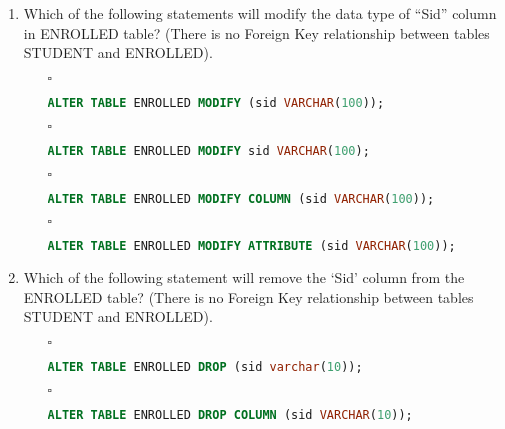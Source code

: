 \documentclass[10pt]{article}
\begin{document}
\begin{enumerate}
			\item Which of the following statements will modify the data type of “Sid” column in ENROLLED table? (There is no Foreign Key relationship between tables STUDENT and ENROLLED).
				\begin{enumerate}
					\item[$\square$] 
						\begin{lstlisting}[language=SQL,firstline=1, lastline=1, numbers = right] 
							ALTER TABLE ENROLLED MODIFY (sid VARCHAR(100));
						\end{lstlisting}
					
					\item[$\square$] 
						\begin{lstlisting}[language=SQL,firstline=1, lastline=1, numbers = right] 
							ALTER TABLE ENROLLED MODIFY sid VARCHAR(100);
						\end{lstlisting}
					
					\item[$\square$] 
						\begin{lstlisting}[language=SQL,firstline=1, lastline=1, numbers = right] 
							ALTER TABLE ENROLLED MODIFY COLUMN (sid VARCHAR(100));
						\end{lstlisting}
				
					\item[$\square$] 
						\begin{lstlisting}[language=SQL,firstline=1, lastline=1, numbers = right] 
							ALTER TABLE ENROLLED MODIFY ATTRIBUTE (sid VARCHAR(100));
						\end{lstlisting}
				\end{enumerate}
			
			\item Which of the following statement will remove the ‘Sid’ column from the ENROLLED table? (There is no Foreign Key relationship between tables STUDENT and ENROLLED).
				\begin{enumerate}
					\item[$\square$] 
						\begin{lstlisting}[language=SQL,firstline=1, lastline=1, numbers = right] 
							ALTER TABLE ENROLLED DROP (sid varchar(10));
						\end{lstlisting}
					
					\item[$\square$] 
						\begin{lstlisting}[language=SQL,firstline=1, lastline=1, numbers = right] 
							ALTER TABLE ENROLLED DROP COLUMN (sid VARCHAR(10));
						\end{lstlisting}
					

\end{enumerate}
\end{enumerate}
\end{document}
